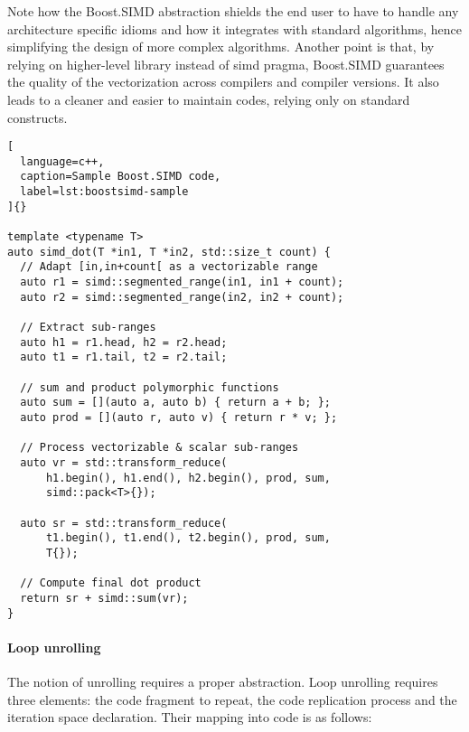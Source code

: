 \documentclass[../main]{subfiles}
\begin{document}
\clearpage%

Note how the Boost.SIMD abstraction shields the end
user to have to handle any architecture specific idioms
and how it integrates with standard algorithms, hence
simplifying the design of more complex algorithms.
Another point is that, by relying on higher-level library
instead of \gls{simd} pragma, Boost.SIMD guarantees
the quality of the vectorization across compilers and
compiler versions. It also leads to a cleaner and easier to
maintain codes, relying only on standard \cpp constructs.

\begin{lstlisting}[
  language=c++,
  caption=Sample Boost.SIMD code,
  label=lst:boostsimd-sample
]{}

template <typename T>
auto simd_dot(T *in1, T *in2, std::size_t count) {
  // Adapt [in,in+count[ as a vectorizable range
  auto r1 = simd::segmented_range(in1, in1 + count);
  auto r2 = simd::segmented_range(in2, in2 + count);

  // Extract sub-ranges
  auto h1 = r1.head, h2 = r2.head;
  auto t1 = r1.tail, t2 = r2.tail;

  // sum and product polymorphic functions
  auto sum = [](auto a, auto b) { return a + b; };
  auto prod = [](auto r, auto v) { return r * v; };

  // Process vectorizable & scalar sub-ranges
  auto vr = std::transform_reduce(
      h1.begin(), h1.end(), h2.begin(), prod, sum,
      simd::pack<T>{});

  auto sr = std::transform_reduce(
      t1.begin(), t1.end(), t2.begin(), prod, sum,
      T{});

  // Compute final dot product
  return sr + simd::sum(vr);
}
\end{lstlisting}

\paragraph{Loop unrolling} The notion of unrolling requires
a proper abstraction. Loop unrolling requires three
elements: the code fragment to repeat, the code
replication process and the iteration space declaration.
Their mapping into \cpp code is as follows:
\end{document}
